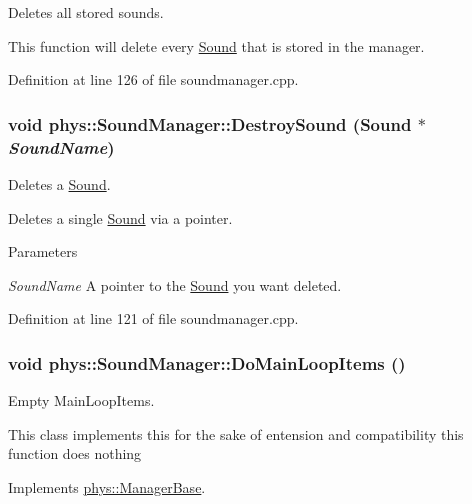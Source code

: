 Deletes all stored sounds. 

This function will delete every \hyperlink{classphys_1_1Sound}{Sound} that is stored in the manager. 

Definition at line 126 of file soundmanager.cpp.

\hypertarget{classphys_1_1SoundManager_a6a996829cab647ccf1ca401361af7167}{
\subsubsection[{DestroySound}]{\setlength{\rightskip}{0pt plus 5cm}void phys::SoundManager::DestroySound ({\bf Sound} $\ast$ {\em SoundName})}}
\label{d1/dc4/classphys_1_1SoundManager_a6a996829cab647ccf1ca401361af7167}


Deletes a \hyperlink{classphys_1_1Sound}{Sound}. 

Deletes a single \hyperlink{classphys_1_1Sound}{Sound} via a pointer. 
\begin{DoxyParams}{Parameters}
\item[{\em SoundName}]A pointer to the \hyperlink{classphys_1_1Sound}{Sound} you want deleted. \end{DoxyParams}


Definition at line 121 of file soundmanager.cpp.

\hypertarget{classphys_1_1SoundManager_a577b228753ea19856b8476ab831e547e}{
\subsubsection[{DoMainLoopItems}]{\setlength{\rightskip}{0pt plus 5cm}void phys::SoundManager::DoMainLoopItems ()}}
\label{d1/dc4/classphys_1_1SoundManager_a577b228753ea19856b8476ab831e547e}


Empty MainLoopItems. 

This class implements this for the sake of entension and compatibility this function does nothing 

Implements \hyperlink{classphys_1_1ManagerBase_aa9e13a3f7c398b708f0f242610b5abf7}{phys::ManagerBase}.



